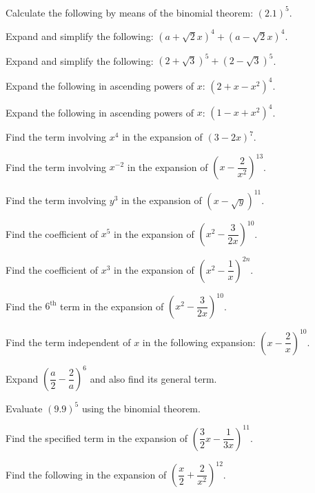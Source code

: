 \documentclass[11pt,a4paper]{article}
\begin{document}
\begin{shortlist}
\item Calculate the following by means of the binomial theorem: $(2.1)^5$.

\item Expand and simplify the following: $(a+\sqrt{2}x)^4+(a-\sqrt{2}x)^4$.

\item Expand and simplify the following: $(2+\sqrt{3})^5+(2-\sqrt{3})^5$.

\item Expand the following in ascending powers of $x$: $(2+x-x^2)^4$.

\item Expand the following in ascending powers of $x$: $(1-x+x^2)^4$.

\item Find the term involving $x^4$ in the expansion of $(3-2x)^7$.

\item Find the term involving $x^{-2}$ in the expansion of $\left(x-\dfrac{2}{x^2}\right)^{13}$.

\item Find the term involving $y^3$ in the expansion of $(x-\sqrt{y})^{11}$.

\item Find the coefficient of $x^5$ in the expansion of $\left(x^2-\dfrac{3}{2x}\right)^{10}$.

\item Find the coefficient of $x^3$ in the expansion of $\left(x^2-\dfrac{1}{x}\right)^{2n}$.

\item Find the $6^{\text{th}}$ term in the expansion of $\left(x^2-\dfrac{3}{2x}\right)^{10}$.

\item Find the term independent of $x$ in the following expansion: $\left(x-\dfrac{2}{x}\right)^{10}$.

\item Expand $\left(\dfrac{a}{2}-\dfrac{2}{a}\right)^6$ and also find its general term.

\item Evaluate $(9.9)^5$ using the binomial theorem.

\item Find the specified term in the expansion of $\left(\dfrac{3}{2}x-\dfrac{1}{3x}\right)^{11}$.

\item Find the following in the expansion of $\left(\dfrac{x}{2}+\dfrac{2}{x^2}\right)^{12}$.


\end{shortlist}
\end{document}
